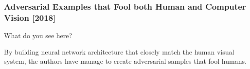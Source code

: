 \documentclass[9pt]{beamer}
\begin{document}
\begin{frame}
  \frametitle{Adversarial Examples that Fool both Human and Computer
    Vision [2018]}

  What do you see here?

  \begin{center}
  \end{center}


  By building neural network architecture that closely match the human
  visual system, the authors have manage to create adversarial samples
  that fool humans.
\end{frame}
\end{document}
